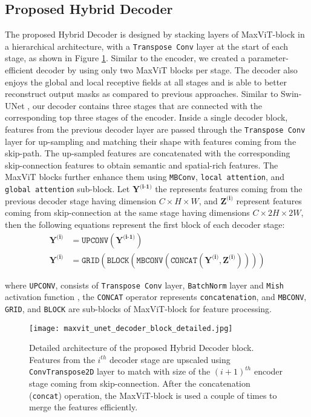 \documentclass{article}
\begin{document}
\subsection{Proposed Hybrid Decoder}\label{Decoder}

The proposed Hybrid Decoder is designed by stacking layers of MaxViT-block in a hierarchical architecture, with a \texttt{Transpose Conv} layer at the start of each stage, as shown in Figure \ref{fig:maxvit-unet-decoder-block}. Similar to the encoder, we created a parameter-efficient decoder by using only two MaxViT blocks per stage. The decoder also enjoys the global and local receptive fields at all stages and is able to better reconstruct output masks as compared to previous approaches. Similar to Swin-UNet \cite{cao2022swin}, our decoder contains three stages that are connected with the corresponding top three stages of the encoder. Inside a single decoder block, features from the previous decoder layer are passed through the \texttt{Transpose Conv} layer for up-sampling and matching their shape with features coming from the skip-path. The up-sampled features are concatenated with the corresponding skip-connection features to obtain semantic and spatial-rich features. The MaxViT blocks further enhance them using \texttt{MBConv}, \texttt{local attention}, and \texttt{global attention} sub-block. Let \(\textbf{Y}^{\textbf{(i-1)}}\) the represents features coming from the previous decoder stage having dimension \(C \times H \times W\), and \(\textbf{Z}^{\textbf{(i)}}\) represent features coming from skip-connection at the same stage having dimensions \(C \times 2H \times 2W\), then the following equations represent the first block of each decoder stage:
\begin{align}
\textbf{Y}^{\textbf{(i)}} &= \texttt{UPCONV}(\textbf{Y}^{\textbf{(i-1)}}) \\
\textbf{Y}^{\textbf{(i)}} &= \texttt{GRID}(\texttt{BLOCK}(\texttt{MBCONV}(\texttt{CONCAT}(\textbf{Y}^{\textbf{(i)}}, \textbf{Z}^{\textbf{(i)}}))))
\end{align}

where \texttt{UPCONV}, consists of \texttt{Transpose Conv} layer, \texttt{BatchNorm} layer \cite{ioffe2015batch} and \texttt{Mish} activation function \cite{misra2019mish}, the \texttt{CONCAT} operator represents \texttt{concatenation}, and \texttt{MBCONV}, \texttt{GRID}, and \texttt{BLOCK} are sub-blocks of MaxViT-block for feature processing.

\begin{figure}[ht!]
  \centering
  \texttt{[image: maxvit\_unet\_decoder\_block\_detailed.jpg]}
  \caption{Detailed architecture of the proposed Hybrid Decoder block. Features from the  \(i^{th}\) decoder stage are upscaled using \texttt{ConvTranspose2D} layer to match with size of the \((i+1)^{th}\) encoder stage coming from skip-connection. After the concatenation (\texttt{concat}) operation, the MaxViT-block is used a couple of times to merge the features efficiently.}
  \label{fig:maxvit-unet-decoder-block}
\end{figure}
\end{document}
